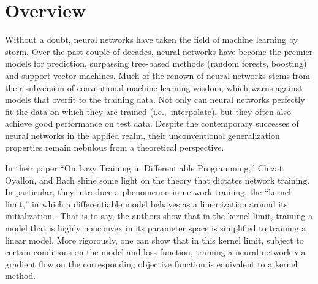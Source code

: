 \documentclass{article}
\begin{document}
\vspace*{\fill}

\pagebreak


\vspace*{\fill}

\begin{centering}
\tableofcontents
\end{centering}

\vspace*{\fill}

\pagebreak

\section{Overview}
Without a doubt, neural networks have taken the field of machine learning by storm. Over the past couple of decades, neural networks have become the premier models for prediction, surpassing tree-based methods (random forests, boosting) and support vector machines. Much of the renown of neural networks stems from their subversion of conventional machine learning wisdom, which warns against models that overfit to the training data. Not only can neural networks perfectly fit the data on which they are trained (i.e.,~interpolate), but they often also achieve good performance on test data. Despite the contemporary successes of neural networks in the applied realm, their unconventional generalization properties remain nebulous from a theoretical perspective.

In their paper \enquote{On Lazy Training in Differentiable Programming,} Chizat, Oyallon, and Bach shine some light on the theory that dictates network training. In particular, they introduce a phenomenon in network training, the \enquote{kernel limit,} in which a differentiable model behaves as a linearization around its initialization \cite{chizat2019lazy}. That is to say, the authors show that in the kernel limit, training a model that is highly nonconvex in its parameter space is simplified to training a linear model. More rigorously, one can show that in this kernel limit, subject to certain conditions on the model and loss function, training a neural network via gradient flow on the corresponding objective function is equivalent to a kernel method.
\end{document}

